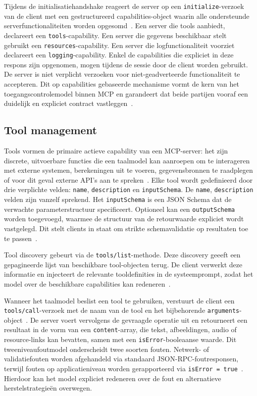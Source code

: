 Tijdens de initialisatiehandshake reageert de server op een \texttt{initialize}-verzoek van de client met een gestructureerd capabilities-object waarin alle ondersteunde serverfunctionaliteiten worden opgesomd~\cite{mcpspec2025}. Een server die tools aanbiedt, declareert een \texttt{tools}-capability. Een server die gegevens beschikbaar stelt gebruikt een \texttt{resources}-capability. Een server die logfunctionaliteit voorziet declareert een \texttt{logging}-capability. Enkel de capabilities die expliciet in deze respons zijn opgenomen, mogen tijdens de sessie door de client worden gebruikt. De server is niet verplicht verzoeken voor niet-geadverteerde functionaliteit te accepteren. Dit op capabilities gebaseerde mechanisme vormt de kern van het toegangscontrolemodel binnen MCP en garandeert dat beide partijen vooraf een duidelijk en expliciet contract vastleggen~\cite{hou2025modelcontextprotocolmcp}.

\subsection{Tool management}\label{subsec:mcp-tools}

Tools vormen de primaire actieve capability van een MCP-server: het zijn discrete, uitvoerbare functies die een taalmodel kan aanroepen om te interageren met externe systemen, berekeningen uit te voeren, gegevensbronnen te raadplegen of voor dit geval externe API's aan te spreken~\cite{mcpspec2025}. Elke tool wordt gedefinieerd door drie verplichte velden: \texttt{name}, \texttt{description} en \texttt{inputSchema}. De \texttt{name}, \texttt{description}  velden zijn vanzelf sprekend. Het \texttt{inputSchema} is een JSON Schema dat de verwachte parameterstructuur specificeert. Optioneel kan een \texttt{outputSchema} worden toegevoegd, waarmee de structuur van de retourwaarde expliciet wordt vastgelegd. Dit stelt clients in staat om strikte schemavalidatie op resultaten toe te passen~\cite{Fan2025MCPToolBenchPP}.

Tool discovery gebeurt via de \texttt{tools/list}-methode. Deze discovery geeeft een gepagineerde lijst van beschikbare tool-objecten terug. De client verwerkt deze informatie en injecteert de relevante tooldefinities in de systeemprompt, zodat het model over de beschikbare capabilities kan redeneren~\cite{Sekar2026MCP}.

Wanneer het taalmodel beslist een tool te gebruiken, verstuurt de client een \texttt{tools/call}-verzoek met de naam van de tool en het bijbehorende \texttt{arguments}-object~\cite{mcpspec2025}. De server voert vervolgens de gevraagde operatie uit en retourneert een resultaat in de vorm van een \texttt{content}-array, die tekst, afbeeldingen, audio of resource-links kan bevatten, samen met een \texttt{isError}-booleaanse waarde. Dit tweeniveaufoutmodel onderscheidt twee soorten fouten. Netwerk- of validatiefouten worden afgehandeld via standaard JSON-RPC-foutresponsen, terwijl fouten op applicatieniveau  worden gerapporteerd via \texttt{isError = true}~\cite{Ray_2025}. Hierdoor kan het model expliciet redeneren over de fout en alternatieve herstelstrategieën overwegen.

